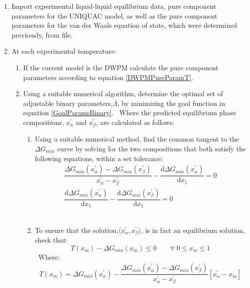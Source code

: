 \begin{enumerate}
\item Import experimental liquid-liquid equilibrium data, pure component parameters for the UNIQUAC model, as well as the pure component parameters for the van der Waals equation of state, which were determined previously, from file.\
\item At each experimental temperature:\
		\begin{enumerate}
		\item If the current model is the DWPM calculate the pure component parameters according to equation \ref{DWPMPureParamT}.\
		\item Using a suitable numerical algorithm, determine the optimal set of adjustable binary parameters,$\overline{\Lambda}$, by minimizing the goal function in equation \ref{GoalParamsBinary}. \label{BinaryParamsOptStep}\
		Where the predicted equilibrium phase compositions, $x_{\alpha}^{\prime}$ and $x_{\beta}^{\prime}$, are calculated as follows:\
		\begin{enumerate}
			\item Using a suitable numerical method, find the common tangent to the $\Delta G_{mix}$ curve by solving for the two compositions that 			both satisfy the following equations, within a set tolerance: \label{PhaseEquilOptStep}\
			\begin{eqnarray}
		 	\dfrac{\Delta G_{mix}\left(x_{\alpha}^{\prime}\right)- \Delta G_{mix}\left(x_{\beta }^{\prime}\right)}{x_{\alpha}^{\prime}-					x_{\beta}^{\prime}} - \dfrac{\mathrm{d}\Delta G_{mix}\left(x_{\alpha}^{\prime}\right)}{\mathrm{d}x_{1}} =0\label{GoalPhaseEq1}\\
		 	\dfrac{\mathrm{d} \Delta G_{mix}\left(x_{\alpha}^{\prime}\right)}{\mathrm{d}x_{1}} - \dfrac{\mathrm{d}\Delta G_{mix}\left(x_{\beta}^{\prime}\right)}{\mathrm{d}x_{1}}=0\label{GoalPhaseEq2}\
			\end{eqnarray}\
			\item To ensure that the solution,$\langle x_{\alpha}^{\prime}, x_{\beta}^{\prime}\rangle$, is in fact an equilibrium solution, check that:\
			\begin{equation}
			 T\left(x_{m}\right)-\Delta G_{mix}\left(x_{m}\right) \leq0 \qquad \forall \; 0\leq x_{m} \leq 1 \label{PhaseEquilTPConstraints}
			\end{equation}\
			Where:\
			\begin{eqnarray}
			T\left(x_{m}\right) = \Delta G_{mix}\left(x_{\alpha}^{\prime}\right) -\dfrac{\Delta G_{mix}\left(x_{\alpha}^{\prime}\right)- \Delta G_{mix}\left(x_{\beta }^{\prime}\right)}{x_{\alpha}^{\prime}-x_{\beta}^{\prime}}\left[x_{\alpha}^{\prime} -x_{m}\right]\nonumber\\

\end{eqnarray}
\end{enumerate}
\end{enumerate}
\end{enumerate}
